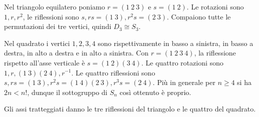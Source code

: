 \begin{esempio}
Nel triangolo equilatero poniamo $r=(1\ 2\ 3)$ e $s=(1\ 2)$. Le rotazioni sono $1,r,r^2$, le riflessioni sono $s,rs=(1\ 3),r^2s=(2\ 3)$. Compaiono tutte le permutazioni dei tre vertici, quindi $D_3\cong S_3$.

Nel quadrato i vertici $1,2,3,4$ sono rispettivamente in basso a sinistra, in basso a destra, in alto a destra e in alto a sinistra. Con $r=(1\ 2\ 3\ 4)$, la riflessione rispetto all'asse verticale è $s=(1\ 2)(3\ 4)$. Le quattro rotazioni sono $1,r,(1\ 3)(2\ 4),r^{-1}$. Le quattro riflessioni sono $s,rs=(1\ 3),r^2s=(1\ 4)(2\ 3),r^3s=(2\ 4)$. Più in generale per $n\ge4$ si ha $2n<n!$, dunque il sottogruppo di $S_n$ così ottenuto è proprio.
\end{esempio}
\begin{center}

Gli assi tratteggiati danno le tre riflessioni del triangolo e le quattro del quadrato.
\end{center}

